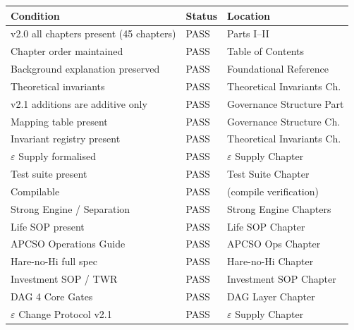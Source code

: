 \begin{table}[ht]
\centering
\small
\begin{tabularx}{\linewidth}{Xll}
\toprule
\textbf{Condition} & \textbf{Status} & \textbf{Location} \\
\midrule

v2.0 all chapters present (45 chapters) & PASS & Parts I--II \\

Chapter order maintained & PASS & Table of Contents \\

Background explanation preserved & PASS & Foundational Reference \\

Theoretical invariants & PASS & Theoretical Invariants Ch. \\

v2.1 additions are additive only & PASS & Governance Structure
Part \\

Mapping table present & PASS & Governance Structure Ch. \\

Invariant registry present & PASS & Theoretical Invariants Ch. \\

$\varepsilon$ Supply formalised & PASS & $\varepsilon$ Supply
Chapter \\

Test suite present & PASS & Test Suite Chapter \\

Compilable & PASS & (compile verification) \\

Strong Engine / Separation & PASS & Strong Engine Chapters \\

Life SOP present & PASS & Life SOP Chapter \\

APCSO Operations Guide & PASS & APCSO Ops Chapter \\

Hare-no-Hi full spec & PASS & Hare-no-Hi Chapter \\

Investment SOP / TWR & PASS & Investment SOP Chapter \\

DAG 4 Core Gates & PASS & DAG Layer Chapter \\

$\varepsilon$ Change Protocol v2.1 & PASS & $\varepsilon$ Supply
Chapter \\


\end{tabularx}
\end{table}
